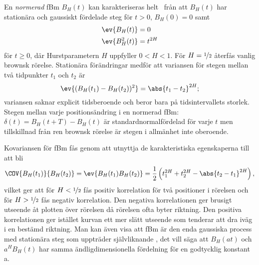 En \emph{normerad} fBm $B_H(t)$ kan karakteriseras helt~\cite{Dieker_fBm} från att $B_H(t)$ har stationära och gaussiskt fördelade steg för $t>0$, $B_H(0)=0$ samt 
\begin{equation}
\begin{aligned}
    \ev{B_H(t)}&=0 \\
    \ev{B^2_H(t)}&=t^{2H}
\end{aligned}
\end{equation}
för $t\geq 0$, där Hurstparametern $H$ uppfyller $0< H <1$. För $H=\nicefrac{1}{2}$ återfås vanlig brownsk rörelse. Stationära förändringar medför att variansen för stegen mellan två tidpunkter $t_1$ och $t_2$ är
\begin{equation} \label{eq:fBm_MSD}
    \ev{(B_H(t_1)-B_H(t_2))^2} = \abs{t_1-t_2}^{2H};
\end{equation}
variansen saknar explicit tidsberoende och beror bara på tidsintervallets storlek. Stegen mellan varje positionsändring i en normerad fBm:  $\delta(t)=B_H(t+T)-B_H(t)$ är standardnormalfördelad för varje $t$ men tillskillnad från ren brownsk rörelse är stegen i allmänhet inte oberoende. 


Kovariansen för fBm fås genom att utnyttja de karakteristiska egenskaperna till att bli
\begin{equation}
\COV{B_H(t_1)}{B_H(t_2)}=\ev{B_H(t_1)B_H(t_2)}
= \frac{1}{2} \left(t_1^{2H}+t_2^{2H}-\abs{t_2-t_1}^{2H}\right),
\end{equation}
vilket ger att för $H<\nicefrac{1}{2}$ fås positiv korrelation för två positioner i rörelsen och för  $H>\nicefrac{1}{2}$ fås negativ korrelation. Den negativa korrelationen ger brusigt utseende åt plotten över rörelsen då rörelsen ofta byter riktning. Den positiva korrelationen ger istället kurvan ett mer slätt utseende som tenderar att dra iväg i en bestämd riktning. Man kan även visa att fBm är den enda gaussiska process med stationära steg som uppträder självliknande \cite{Dieker_fBm}, det vill säga att $B_H(at)$ och $a^H B_H(t)$ har samma ändligdimensionella fördelning för en godtycklig konstant a.

